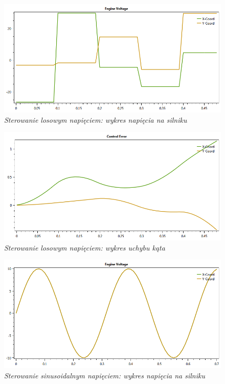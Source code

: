 \documentclass[12pt, oneside]{report}
\theoremstyle{definition}
\begin{document}
\begin{figure}[H]
	\centering
		\includegraphics[width = 350pt]{RandomEV} 
		\caption{\textit{Sterowanie losowym napięciem: wykres napięcia na silniku}}
		\label{plot:RandomEV}
\end{figure}

\begin{figure}[H]
	\centering
		\includegraphics[width = 350pt]{RandomCE} 
		\caption{\textit{Sterowanie losowym napięciem: wykres uchybu kąta}}
		\label{plot:RandomCE}
\end{figure}

\newpage

\begin{figure}[H]
	\centering
		\includegraphics[width = 350pt]{SinusoidalEV} 
		\caption{\textit{Sterowanie sinusoidalnym napięciem: wykres napięcia na silniku}}
		\label{plot:SinusoidalEV}
\end{figure}
\end{document}
